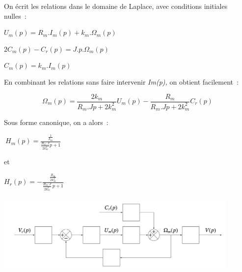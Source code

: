\begin{texteCache}
 On écrit les relations dans le domaine de Laplace, avec conditions
  initiales nulles~:

  \(U_{m}\left( p \right) = R_{m}.I_{m}\left( p \right) + k_{m}.\Omega_{m}\left( p \right)\)

  \({2C}_{m}\left( p \right) - C_{r}\left( p \right) = J.p.\Omega_{m}\left( p \right)\)

  \(C_{m}\left( p \right) = k_{m}.I_{m}\left( p \right)\)

  En combinant les relations sans faire intervenir \emph{Im(p),} on
  obtient facilement~:


\[\Omega_{m}\left( p \right) = \frac{2k_{m}}{R_{m}.Jp + 2k_{m}^2}U_{m}\left( p \right) - \frac{R_{m}}{R_{m}.Jp + 2k_{m}^2}C_{r}\left( p \right)\]

Sous forme canonique, on a alors~:


\(\ H_{m}\left( p \right) = \frac{\frac{1}{k_{m}}}{\frac{R_{m}.J}{2k_{m}^2}p + 1}\)


et


\(H_{r}\left( p \right) = - \frac{\frac{R_{m}}{2k_{m}^2}}{\frac{R_{m}.J}{2k_{m}^2}\ p + 1}\)

\end{texteCache}

{
\begin{center}
\includegraphics[width=0.9\textwidth]{images/schema_bloc0}
\end{center}
}

